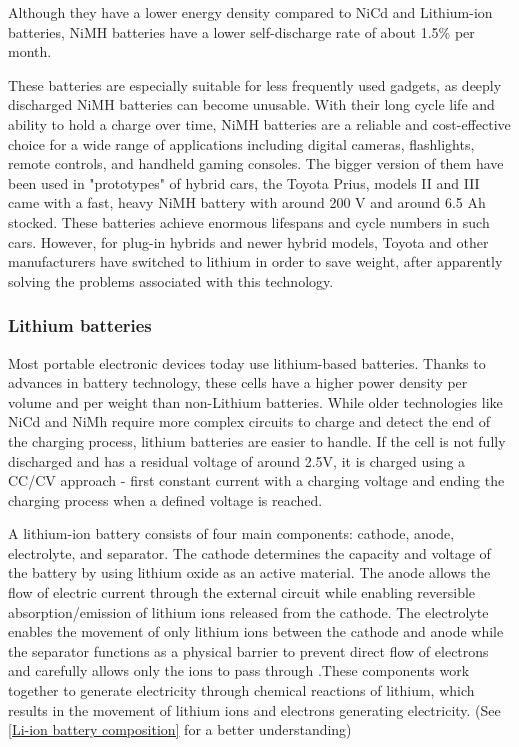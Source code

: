 Although they have a lower energy density compared to NiCd and Lithium-ion batteries, NiMH batteries have a lower self-discharge rate of about 1.5\% per month. 

These batteries are especially suitable for less frequently used gadgets, as deeply discharged NiMH batteries can become unusable. With their long cycle life and ability to hold a charge over time, NiMH batteries are a reliable \cite{Scherer:2022} and cost-effective choice  for a wide range of applications including digital cameras, flashlights, remote controls, and handheld gaming consoles. 
The bigger version of them  have been used in "prototypes" of hybrid cars, the Toyota Prius, models II and III came with a fast, heavy NiMH battery with around 200 V and around 6.5 Ah stocked.
These batteries achieve enormous lifespans and cycle numbers in such cars. However, for plug-in hybrids and newer hybrid models, Toyota and other manufacturers have switched to lithium in order to save weight, after apparently solving the problems associated with this technology. \cite{Scherer:2022}


\subsubsection{Lithium batteries}


Most portable electronic devices today use lithium-based batteries. 
Thanks to advances in battery technology, these cells have a higher power density per volume and per weight than non-Lithium batteries. While older technologies like NiCd and NiMh require more complex circuits to charge and detect the end of the charging process, lithium batteries are easier to handle. 
If the cell is not fully discharged and has a residual voltage of around 2.5V, it is charged using a CC/CV approach - first constant current with a charging voltage and ending the charging process when a defined voltage is reached. \cite{Scherer:2022}

A lithium-ion battery consists of four main components: cathode, anode, electrolyte, and separator. The cathode determines the capacity and voltage of the battery by using lithium oxide as an active material. The anode allows the flow of electric current through the external circuit while enabling reversible absorption/emission of lithium ions released from the cathode. The electrolyte enables the movement of only lithium ions between the cathode and anode while the separator functions as a physical barrier to prevent direct flow of electrons and carefully allows only the ions to pass through \cite{samsungsdi}  %
\cite{Li:2021}.These components work together to generate electricity through chemical reactions of lithium, which results in the movement of lithium ions and electrons generating electricity. (See \ref{Li-ion battery composition} for a better understanding)

